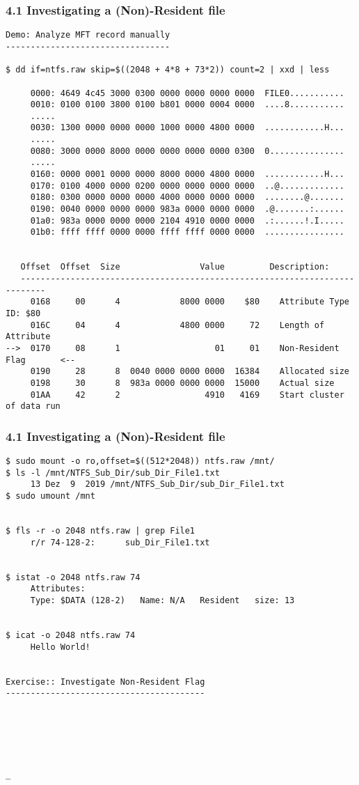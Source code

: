\begin{frame}[fragile]
  \frametitle{4.1 Investigating a (Non)-Resident file}
  \begin{lstlisting}[basicstyle=\tiny]
Demo: Analyze MFT record manually
---------------------------------

$ dd if=ntfs.raw skip=$((2048 + 4*8 + 73*2)) count=2 | xxd | less

     0000: 4649 4c45 3000 0300 0000 0000 0000 0000  FILE0...........
     0010: 0100 0100 3800 0100 b801 0000 0004 0000  ....8...........
     .....
     0030: 1300 0000 0000 0000 1000 0000 4800 0000  ............H...
     .....
     0080: 3000 0000 8000 0000 0000 0000 0000 0300  0...............
     .....
     0160: 0000 0001 0000 0000 8000 0000 4800 0000  ............H...
     0170: 0100 4000 0000 0200 0000 0000 0000 0000  ..@.............
     0180: 0300 0000 0000 0000 4000 0000 0000 0000  ........@.......
     0190: 0040 0000 0000 0000 983a 0000 0000 0000  .@.......:......
     01a0: 983a 0000 0000 0000 2104 4910 0000 0000  .:......!.I.....
     01b0: ffff ffff 0000 0000 ffff ffff 0000 0000  ................


   Offset  Offset  Size                Value         Description:
   ---------------------------------------------------------------------------
     0168     00      4            8000 0000    $80    Attribute Type ID: $80
     016C     04      4            4800 0000     72    Length of Attribute
-->  0170     08      1                   01     01    Non-Resident Flag       <--
     0190     28      8  0040 0000 0000 0000  16384    Allocated size
     0198     30      8  983a 0000 0000 0000  15000    Actual size
     01AA     42      2                 4910   4169    Start cluster of data run
  \end{lstlisting}
\end{frame}


\begin{frame}[fragile]
  \frametitle{4.1 Investigating a (Non)-Resident file}
  \begin{lstlisting}[basicstyle=\tiny]
$ sudo mount -o ro,offset=$((512*2048)) ntfs.raw /mnt/
$ ls -l /mnt/NTFS_Sub_Dir/sub_Dir_File1.txt
     13 Dez  9  2019 /mnt/NTFS_Sub_Dir/sub_Dir_File1.txt
$ sudo umount /mnt


$ fls -r -o 2048 ntfs.raw | grep File1
     r/r 74-128-2:      sub_Dir_File1.txt


$ istat -o 2048 ntfs.raw 74
     Attributes:
     Type: $DATA (128-2)   Name: N/A   Resident   size: 13


$ icat -o 2048 ntfs.raw 74
     Hello World!


Exercise:: Investigate Non-Resident Flag
----------------------------------------






_
  \end{lstlisting}
\end{frame}


